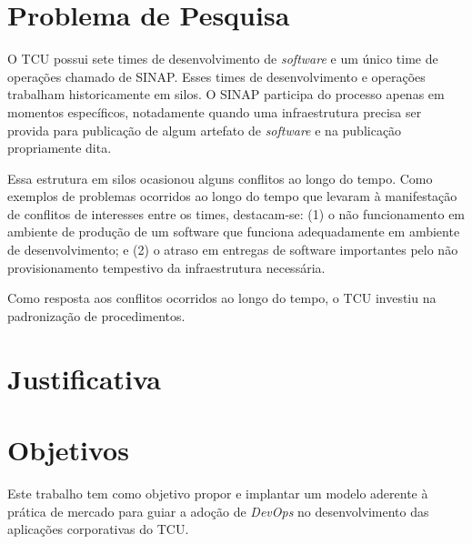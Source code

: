 \section{Problema de Pesquisa}%
O \acrshort{TCU} possui sete times de desenvolvimento de \textit{software} e um
único time de operações chamado de \acrfull{SINAP}. Esses times de
desenvolvimento e operações trabalham historicamente em silos.
O \acrshort{SINAP} participa do processo apenas em
momentos específicos, notadamente quando uma infraestrutura precisa ser provida
para publicação de algum artefato de \textit{software} e na publicação
propriamente dita.

Essa estrutura em silos ocasionou alguns conflitos ao longo do tempo. Como
exemplos de problemas ocorridos ao longo do tempo que levaram à manifestação
de conflitos de interesses entre os times, destacam-se: (1) o não
funcionamento em ambiente de produção de um software que funciona adequadamente
em ambiente de desenvolvimento; e (2) o atraso em entregas de software
importantes pelo não provisionamento tempestivo da infraestrutura necessária.

Como resposta aos conflitos ocorridos ao longo do tempo, o \acrshort{TCU}
investiu na padronização de procedimentos. 

\section{Justificativa}%


\section{Objetivos}
Este trabalho tem como objetivo propor e implantar um modelo aderente à prática
de mercado para guiar a adoção de \textit{DevOps} no desenvolvimento das
aplicações corporativas do \acrshort{TCU}.

